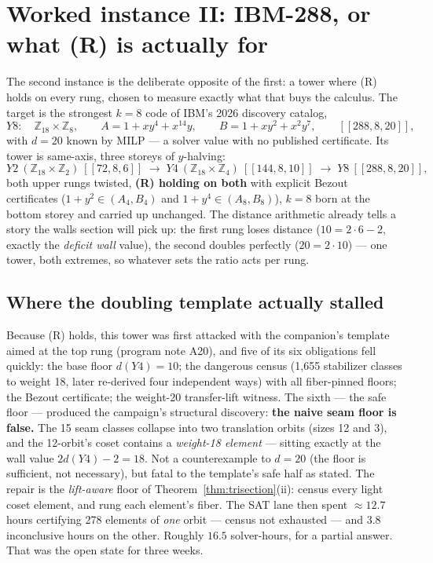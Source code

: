 \documentclass[11pt]{article}
\theoremstyle{plain}
\theoremstyle{definition}
\theoremstyle{remark}
\newcommand{\Z}{\mathbb{Z}}
\begin{document}
\section{Worked instance II: IBM-288, or what (R) is actually for}
\label{sec:ibm288}

The second instance is the deliberate opposite of the first: a tower
where (R) holds on every rung, chosen to measure exactly what that buys
the calculus. The target is the strongest $k = 8$ code of IBM's 2026
discovery catalog,
\[
Y8: \quad \Z_{18} \times \Z_8, \qquad
A = 1 + xy^4 + x^{14}y, \qquad B = 1 + xy^2 + x^2y^7, \qquad
[[288, 8, 20]],
\]
with $d = 20$ known by MILP --- a solver value with no published
certificate. Its tower is same-axis, three storeys of $y$-halving:
\[
Y2\ (\Z_{18}{\times}\Z_2)\ [[72,8,6]]
\;\longrightarrow\;
Y4\ (\Z_{18}{\times}\Z_4)\ [[144,8,10]]
\;\longrightarrow\;
Y8\ [[288,8,20]],
\]
both upper rungs twisted, \textbf{(R) holding on both} with explicit
Bezout certificates ($1 + y^2 \in (A_4, B_4)$ and $1 + y^4 \in (A_8,
B_8)$), $k = 8$ born at the bottom storey and carried up unchanged. The
distance arithmetic already tells a story the walls section will pick
up: the first rung loses distance ($10 = 2\cdot 6 - 2$, exactly the
\emph{deficit wall} value), the second doubles perfectly ($20 = 2 \cdot
10$) --- one tower, both extremes, so whatever sets the ratio acts per
rung.

\subsection{Where the doubling template actually stalled}

Because (R) holds, this tower was first attacked with the companion's
template aimed at the top rung (program note A20), and five of its six
obligations fell quickly: the base floor $d(Y4) = 10$; the dangerous
census (1,655 stabilizer classes to weight 18, later re-derived four
independent ways) with all fiber-pinned floors; the Bezout certificate;
the weight-20 transfer-lift witness. The sixth --- the safe floor ---
produced the campaign's structural discovery: \textbf{the naive seam
floor is false.} The 15 seam classes collapse into two translation
orbits (sizes 12 and 3), and the 12-orbit's coset contains a
\emph{weight-18 element} --- sitting exactly at the wall value $2 d(Y4)
- 2 = 18$. Not a counterexample to $d = 20$ (the floor is sufficient,
not necessary), but fatal to the template's safe half as stated. The
repair is the \emph{lift-aware} floor of
Theorem~\ref{thm:trisection}(ii): census every light coset element, and
rung each element's fiber. The SAT lane then spent ${\approx}12.7$ hours
certifying 278 elements of \emph{one} orbit --- census not exhausted ---
and $3.8$ inconclusive hours on the other. Roughly $16.5$ solver-hours,
for a partial answer. That was the open state for three weeks.
\end{document}
